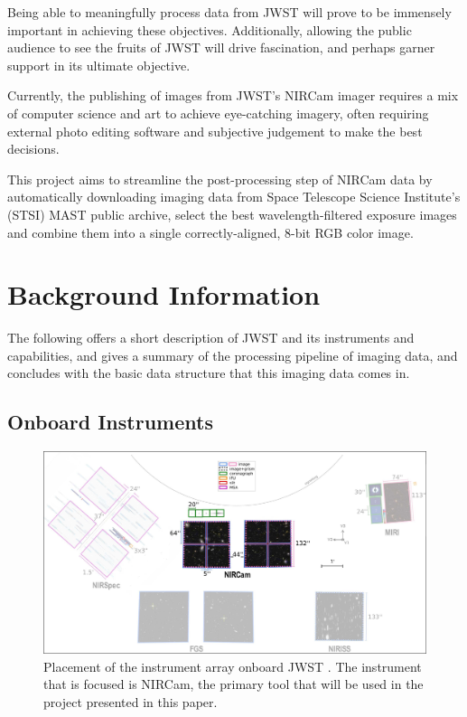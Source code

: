 \documentclass[10pt,twocolumn,letterpaper]{article}
\begin{document}
Being able to meaningfully process data from JWST will prove to be immensely important in achieving these objectives. Additionally, allowing the public audience to see the fruits of JWST will drive fascination, and perhaps garner support in its ultimate objective.

Currently, the publishing of images from JWST's NIRCam imager requires a mix of computer science and art to achieve eye-catching imagery, often requiring external photo editing software and subjective judgement to make the best decisions.

This project aims to streamline the post-processing step of NIRCam data by automatically downloading imaging data from Space Telescope Science Institute's (STSI) MAST public archive, select the best wavelength-filtered exposure images and combine them into a single correctly-aligned, 8-bit RGB color image.

\section{Background Information}
\label{sec:background}

The following offers a short description of JWST and its instruments and capabilities, and gives a summary of the processing pipeline of imaging data, and concludes with the basic data structure that this imaging data comes in.

\subsection{Onboard Instruments}

\begin{figure}
  \centering
    \includegraphics[scale=0.18]{instrument_array}
  \caption{Placement of the instrument array onboard JWST \cite{webbnircam}. The instrument that is focused is NIRCam, the primary tool that will be used in the project presented in this paper.}
  \label{fig:instruments}
\end{figure}
\end{document}
